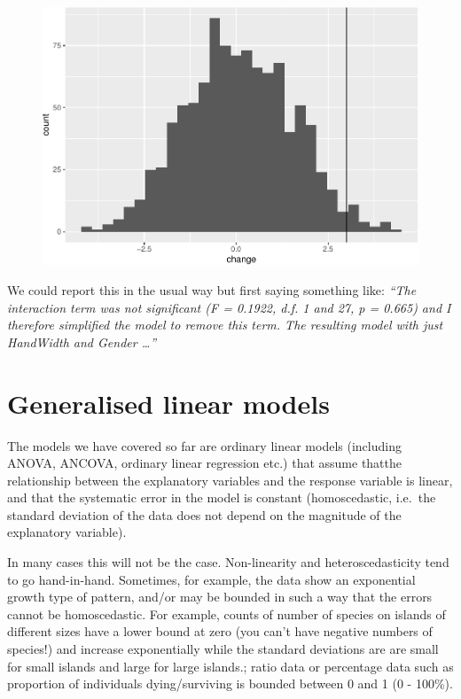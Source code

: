 \documentclass[
  a4paperpaper,
]{book}
\begin{document}
\begin{figure}[ht]

{\centering \includegraphics{BB852_files/figure-latex/unnamed-chunk-228-1} 

}

\end{figure}

We could report this in the usual way but first saying something like: \emph{``The interaction term was not significant (F = 0.1922, d.f. 1 and 27, p = 0.665) and I therefore simplified the model to remove this term. The resulting model with just HandWidth and Gender \ldots{}''}

\hypertarget{generalised-linear-models}{%
\chapter{Generalised linear models}\label{generalised-linear-models}}

The models we have covered so far are ordinary linear models (including ANOVA, ANCOVA, ordinary linear regression etc.) that assume thatthe relationship between the explanatory variables and the response variable is linear, and that the systematic error in the model is constant (homoscedastic, i.e.~the standard deviation of the data does not depend on the magnitude of the explanatory variable).

In many cases this will not be the case. Non-linearity and heteroscedasticity tend to go hand-in-hand. Sometimes, for example, the data show an exponential growth type of pattern, and/or may be bounded in such a way that the errors cannot be homoscedastic. For example, counts of number of species on islands of different sizes have a lower bound at zero (you can't have negative numbers of species!) and increase exponentially while the standard deviations are are small for small islands and large for large islands.; ratio data or percentage data such as proportion of individuals dying/surviving is bounded between 0 and 1 (0 - 100\%).
\end{document}
